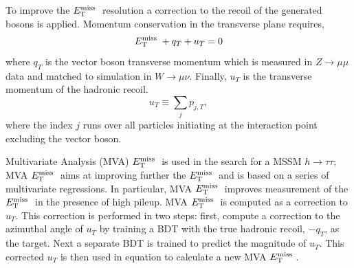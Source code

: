 To improve the $E_\mathrm{T}^{\mathrm{miss}}\;$ resolution a correction to the recoil of the generated bosons is applied. 
Momentum conservation in the transverse plane requires,
\begin{equation}
E_\mathrm{T}^{\mathrm{miss}}\;+q_{T}+u_{T}=0
\end{equation}
where $q_{T}$ is the vector boson transverse momentum which is measured
in $Z\rightarrow\mu\mu$ data and matched to simulation in $W\rightarrow\mu\nu$.
Finally, $u_{T}$ is the transverse momentum of the hadronic recoil.
\begin{equation}
u_{T}\equiv\sum_{j} p_{j,T},
\end{equation}
where the index $j$ runs over all particles initiating at the interaction point excluding
the vector boson. 

Multivariate Analysis (MVA) 
$E_\mathrm{T}^{\mathrm{miss}}\;$ is used in the search for a MSSM $h\rightarrow\tau\tau$;
MVA $E_\mathrm{T}^{\mathrm{miss}}\;$ aims at improving further the $E_\mathrm{T}^{\mathrm{miss}}\;$
and is based on a series of multivariate regressions.
In particular, MVA $E_\mathrm{T}^{\mathrm{miss}}\;$ improves measurement of the $E_\mathrm{T}^{\mathrm{miss}}\;$
in the presence of high pileup.
MVA $E_\mathrm{T}^{\mathrm{miss}}\;$ is computed as a correction to $u_{T}$. This correction
is performed in two steps: %
first, compute a correction to the azimuthal angle
of $u_{T}$ by training a BDT with the true hadronic recoil, $-q_{T}$, as the target. Next
 a separate BDT is trained to predict the magnitude of $u_{T}$. This corrected
 $u_{T}$ is then used in equation %
 to calculate a new MVA $E_\mathrm{T}^{\mathrm{miss}}\;$. %
